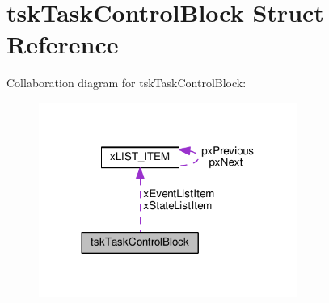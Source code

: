 \hypertarget{structtskTaskControlBlock}{}\section{tsk\+Task\+Control\+Block Struct Reference}
\label{structtskTaskControlBlock}


Collaboration diagram for tsk\+Task\+Control\+Block\+:\nopagebreak
\begin{figure}[H]
\begin{center}
\leavevmode
\includegraphics[width=240pt]{dd/d78/structtskTaskControlBlock__coll__graph}
\end{center}
\end{figure}
